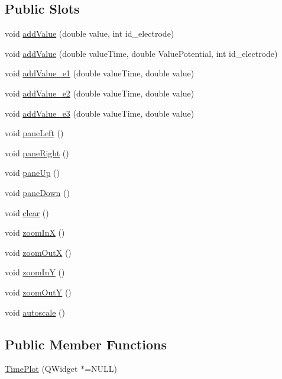 \subsection*{Public Slots}
\begin{DoxyCompactItemize}
\item 
void \hyperlink{class_time_plot_aaf0a9dc901fa6cca98ab9bc7ac0d8ab8}{add\+Value} (double value, int id\+\_\+electrode)
\item 
void \hyperlink{class_time_plot_a75ac3adcc3fa43c189e5c762e8536ffd}{add\+Value} (double value\+Time, double Value\+Potential, int id\+\_\+electrode)
\item 
void \hyperlink{class_time_plot_ad90e7c8e1e4a5bb9d342d55aaf02c61d}{add\+Value\+\_\+e1} (double value\+Time, double value)
\item 
void \hyperlink{class_time_plot_a5f86824066b46234e44c1181c273f01b}{add\+Value\+\_\+e2} (double value\+Time, double value)
\item 
void \hyperlink{class_time_plot_afe89c6014d11cde97e6a39e9ce33ad21}{add\+Value\+\_\+e3} (double value\+Time, double value)
\item 
void \hyperlink{class_time_plot_aa97d05708f827591712ee6fc487d6433}{pane\+Left} ()
\item 
void \hyperlink{class_time_plot_a0fcaf8e55c91bb77bc5fe277f479c4c4}{pane\+Right} ()
\item 
void \hyperlink{class_time_plot_ae21bba56d85e102c911acaa44627e0cc}{pane\+Up} ()
\item 
void \hyperlink{class_time_plot_a08ae17f53a7df7ad3bd3f2262bd83ebd}{pane\+Down} ()
\item 
void \hyperlink{class_time_plot_a60cb1a4789413379c9d520a329d766f0}{clear} ()
\item 
void \hyperlink{class_time_plot_a2d92b4dd295819801ae7f53d5c077242}{zoom\+In\+X} ()
\item 
void \hyperlink{class_time_plot_a2aecd88f70634747f6368c786578fbfe}{zoom\+Out\+X} ()
\item 
void \hyperlink{class_time_plot_aba49b973f5a79f81d70b7e0ea96a3206}{zoom\+In\+Y} ()
\item 
void \hyperlink{class_time_plot_ace67808742a97c6456689c2c1e30610f}{zoom\+Out\+Y} ()
\item 
void \hyperlink{class_time_plot_a830ae71cb3450da6aa98e6ae0344c54d}{autoscale} ()
\end{DoxyCompactItemize}
\subsection*{Public Member Functions}
\begin{DoxyCompactItemize}
\item 
\hyperlink{class_time_plot_a880ba93ed4a2fc6b29223517c4471f51}{Time\+Plot} (Q\+Widget $\ast$=N\+U\+L\+L)
\end{DoxyCompactItemize}
